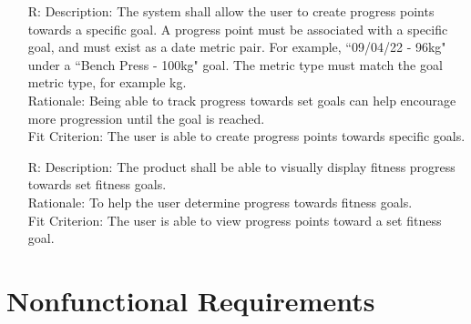 \documentclass[12pt]{article}
\newcounter{reqnum} %
\begin{document}
\begin{itemize}
\item[R\refstepcounter{reqnum}\thereqnum \label{R_Inputs}:]
Description: The system shall allow the user to create progress points towards a specific goal.
A progress point must be associated with a specific goal, and must exist as a date metric pair. For example, ``09/04/22 - 96kg" under a ``Bench Press - 100kg" goal. The metric type must match the goal metric type, for example kg.
\\ Rationale: Being able to track progress towards set goals can help encourage more progression until the goal is reached.
\\ Fit Criterion: The user is able to create progress points towards specific goals.

\item[R\refstepcounter{reqnum}\thereqnum \label{R_Inputs}:]
Description: The product shall be able to visually display fitness progress towards set fitness goals.
\\ Rationale: To help the user determine progress towards fitness goals.
\\ Fit Criterion: The user is able to view progress points toward a set fitness goal.


\end{itemize}


\section{Nonfunctional Requirements}

\end{document}

